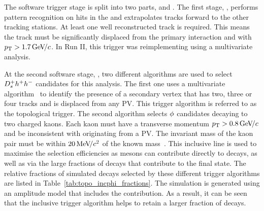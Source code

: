 The software trigger stage is split into two parts, \hltone and \hlttwo.
The first stage, \hltone, performs pattern recognition on hits in the \velo and extrapolates tracks forward to the other tracking stations. At least one well reconstructed track is required. This means the track must be significantly displaced from the primary interaction and with $\mbox{$p_{\mathrm{ T}}$} > 1.7 {\mathrm{\,Ge\kern -0.1em V\!/}c}$. In Run II, this trigger was reimplementing using a multivariate analysis. 


At the second software stage, \hlttwo, two different algorithms are used to select ${{D}^+_{s}} h^{+}h^{-}$ candidates for this analysis.
The first one uses a multivariate algorithm~\cite{BBDT} to identify the presence of a secondary vertex that has two, three or four tracks and is displaced from any PV. 
This trigger algorithm is referred to as the topological trigger.
The second algorithm selects $\phi$ candidates decaying to two charged kaons. Each kaon must have a transverse momentum $\mbox{$p_{\mathrm{ T}}$} > 0.8{\mathrm{\,Ge\kern -0.1em V\!/}c}$ and be inconsistent with originating from a PV. The invariant mass of the kaon pair must be within $20{\mathrm{\,Me\kern -0.1em V\!/}c^2}$ of the known \phiz mass~\cite{PDG2016}.
This inclusive \phiz line is used to maximise the selection efficiencies as \phiz mesons can contribute directly to \decay{\Bp}{\Dsp\phiz} decays, as well as via the large fractions of \decay{\Dsp}{\phiz\pip} decays that contribute to the \decay{\Dsp}{\Kp\Km\pip} final state.
The relative fractions of simulated \decay{\Bp}{\Dsp\phiz} decays selected by these different trigger algorithms are listed in Table~\ref{tab:topo_incphi_fractions}. The \decay{\Dsp}{\Kp\Km\pip} simulation is generated using an amplitude model that includes the \decay{\Dsp}{\phiz\pip} contribution. As a result, it can be seen that the inclusive \phiz trigger algorithm helps to retain a larger fraction of decays. 

